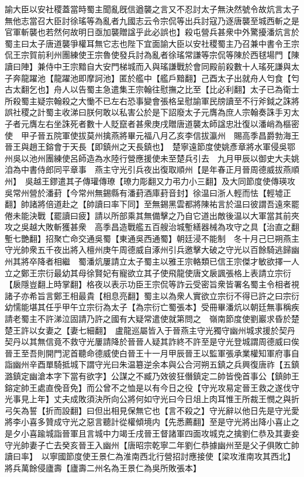 諭大臣以安社稷蓋當時蜀主聞亂旣信遒襲之言又不忍討太子無決然號令故炕言太子無他志當召大臣討徐瑤等為亂者九國志云令宗侃等出兵討寇乃逐唐襲至城西斬之是官軍斬襲也若然何故明日亟加襲贈諡乎此必誤也】殺屯營兵甚衆中外驚擾潘炕言於蜀主曰太子唐道襲爭權耳無它志也陛下宜面諭大臣以安社稷蜀主乃召兼中書令王宗侃王宗賀前利州團練使王宗魯使發兵討為亂者徐瑤常謙等宗侃等陳於西毬場門【陳讀曰陣】兼侍中王宗黯自大安門梯城而入與瑤謙戰於會同殿前殺數十人瑤死謙與太子奔龍躍池【龍躍池即摩訶池】匿於艦中【艦戶黯翻】己酉太子出就舟人匄食【匄古太翻乞也】舟人以告蜀主急遣集王宗翰往慰撫之比至【比必利翻】太子已為衛士所殺蜀主疑宗翰殺之大慟不已左右恐事變會張格呈慰諭軍民牓讀至不行斧鉞之誅將誤社稷之計蜀主收涕曰朕何敢以私害公於是下詔廢太子元膺為庶人宗翰奏誅手刃太子者元膺左右坐誅死者數十人貶竄者甚衆庚戌贈唐道襲太師諡忠壯復以潘峭為樞密使　甲子晉五院軍使拔莫州擒燕將畢元福八月乙亥李信拔瀛州　賜高季昌爵勃海王　晉王與趙王鎔會于天長【即鎮州之天長鎮也】　楚寧遠節度使姚彥章將水軍侵吳鄂州吳以池州團練使呂師造為水陸行營應援使未至楚兵引去　九月甲辰以御史大夫姚洎為中書侍郎同平章事　燕主守光引兵夜出復取順州【是年春正月晉周德威拔燕順州】　吳越王鏐遣其子傳瓘傳璙【璙力彫翻又力弔力小三翻】及大同節度使傳瑛攻吳常州營於潘葑【今常州無錫縣有潘葑酒庫葑音封】徐温曰浙人輕而怯【輕墟正翻】帥諸將倍道赴之【帥讀曰率下同】至無錫黑雲都將陳祐言於温曰彼謂吾遠來罷倦未能決戰【罷讀曰疲】請以所部乘其無備擊之乃自它道出敵後温以大軍當其前夾攻之吳越大敗斬獲甚衆　高季昌造戰艦五百艘治城塹繕器械為攻守之具【治直之翻塹七艷翻】招聚亡命交通吳蜀【東通吳西通蜀】朝廷浸不能制　冬十月己巳朔燕主守光帥衆五千夜出將入檀州庚午周德威自涿州引兵邀擊大破之守光以百餘騎逃歸幽州其將卒降者相繼　蜀潘炕屢請立太子蜀主以雅王宗輅類已信王宗傑才敏欲擇一人立之鄭王宗衍最幼其母徐賢妃有寵欲立其子使飛龍使唐文扆諷張格上表請立宗衍【扆隱豈翻上時掌翻】格夜以表示功臣王宗侃等詐云受密旨衆皆署名蜀主令相者視諸子亦希旨言鄭王相最貴【相息亮翻】蜀主以為衆人實欲立宗衍不得已許之曰宗衍幼懦能堪其任乎甲午立宗衍為太子【為宗衍亡蜀張本】受冊畢潘炕以朝廷無事稱疾請老蜀主不許涕泣固請乃許之國有大疑常遣使就第問之　嶺南節度使劉巖求昏於楚楚王許以女妻之【妻七細翻】　盧龍巡屬皆入于晉燕主守光獨守幽州城求援於契丹契丹以其無信竟不救守光屢請降於晉晉人疑其詐終不許至是守光登城謂周德威曰俟晉王至吾則開門泥首聽命德威使白晉王十一月甲辰晉王以監軍張承業權知軍府事自詣幽州辛酉單騎抵城下謂守光曰朱温簒逆余本與公合河朔五鎮之兵興復唐祚【五鎮潞鎮定幽滄本字下當有欲字】公謀之不臧乃效彼狂僭鎮定二帥皆俛首事公【鎮帥王鎔定帥王處直俛音免】而公曾不之恤是以有今日之役【守光攻易定晉王救之遂伐守光事見上年】丈夫成敗須決所向公將何如守光曰今日俎上肉耳惟王所裁王憫之與折弓矢為誓【折而設翻】曰但出相見保無它也【言不殺之】守光辭以他日先是守光愛將李小喜多贊成守光之惡言聽計從權傾境内【先悉薦翻】至是守光將出降小喜止之是夕小喜踰城詣晉軍且言城中力竭壬戌晉王督諸軍四面攻城克之擒劉仁恭及其妻妾守光帥妻子亡去癸亥晉王入幽州【唐昭宗乾寧二年劉仁恭據幽州至是父子俱敗亡帥讀曰率】　以寧國節度使王景仁為淮南西北行營招討應接使【梁攻淮南攻其西北】將兵萬餘侵廬壽【廬壽二州名為王景仁為吳所敗張本】

